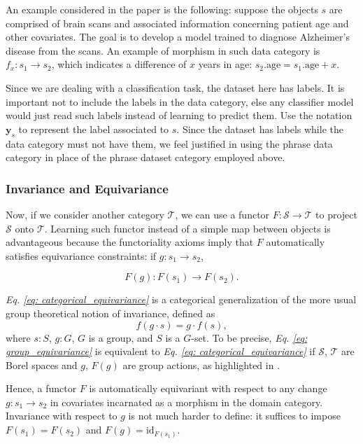 \documentclass[12pt,a4paper,openright,twoside]{report}
\theoremstyle{plain}
\theoremstyle{definition}
\begin{document}
An example considered in the paper is the following: suppose the objects $s$ are comprised of brain scans and associated information concerning patient age and other covariates. The goal is to develop a model trained to diagnose Alzheimer's disease from the scans. An example of morphism in such data category is $f_x: s_1 \to s_2$, which indicates a difference of $x$ years in age: $s_2.\mathrm{age} = s_1.\mathrm{age} + x$.


Since we are dealing with a classification task, the dataset here has labels. It is important not to include the labels in the data category, else any classifier model would just read such labels instead of learning to predict them. Use the notation $\mathbf{y}_s$ to represent the label associated to $s$. Since the dataset has labels while the data category must not have them, we feel justified in using the phrase data category in place of the phrase dataset category employed above.


\subsubsection{Invariance and Equivariance}


Now, if we consider another category $\mathcal{T}$, we can use a functor $F: \mathcal{S} \to \mathcal{T}$ to project $\mathcal{S}$ onto $\mathcal{T}$. Learning such functor instead of a simple map between objects is advantageous because the functoriality axioms imply that $F$ automatically satisfies equivariance constraints: if $g: s_1 \to s_2$,

\begin{equation}
  \label{eq: categorical_equivariance}
  F(g): F(s_1) \to F(s_2).
\end{equation}

\textit{Eq. \ref{eq: categorical_equivariance}} is a categorical generalization of the more usual group theoretical notion of invariance, defined as
\begin{equation}
  \label{eq: group_equivariance}
  f(g \cdot s) = g \cdot f(s),
\end{equation}
where $s : S$, $g : G$, $G$ is a group, and $S$ is a $G$-set. To be precise, \textit{Eq. \ref{eq: group_equivariance}} is equivalent to \textit{Eq. \ref{eq: categorical_equivariance}} if $\mathcal{S}$, $\mathcal{T}$ are Borel spaces and $g$, $F(g)$ are group actions, as highlighted in \cite{chytas2024poolingimagedatasetsmultiple}.


Hence, a functor $F$ is automatically equivariant with respect to any change $g: s_1 \to s_2$ in covariates incarnated as a morphism in the domain category. Invariance with respect to $g$ is not much harder to define: it suffices to impose $F(s_1) = F(s_2)$ and $F(g) = \mathrm{id}_{F(s_1)}$.
\end{document}
